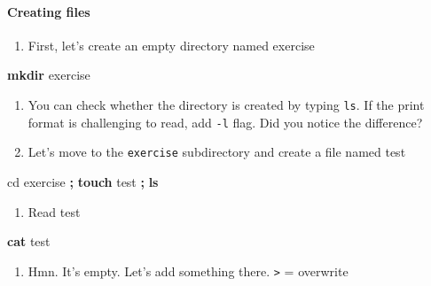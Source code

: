 \documentclass[
]{book}
\newenvironment{Shaded}{\begin{snugshade}}{\end{snugshade}}
\newcommand{\BuiltInTok}[1]{#1}
\newcommand{\FunctionTok}[1]{\textcolor[rgb]{0.13,0.29,0.53}{\textbf{#1}}}
\newcommand{\KeywordTok}[1]{\textcolor[rgb]{0.13,0.29,0.53}{\textbf{#1}}}
\newcommand{\NormalTok}[1]{#1}
\providecommand{\tightlist}{%
  \setlength{\itemsep}{0pt}\setlength{\parskip}{0pt}}
\begin{document}
\paragraph{Creating files}\label{creating-files}

\begin{enumerate}
\def\labelenumi{\arabic{enumi}.}
\tightlist
\item
  First, let's create an empty directory named exercise
\end{enumerate}

\begin{Shaded}
\begin{Highlighting}[]
\FunctionTok{mkdir}\NormalTok{ exercise}
\end{Highlighting}
\end{Shaded}

\begin{enumerate}
\def\labelenumi{\arabic{enumi}.}
\setcounter{enumi}{1}
\item
  You can check whether the directory is created by typing \texttt{ls}. If the print format is challenging to read, add \texttt{-l} flag. Did you notice the difference?
\item
  Let's move to the \texttt{exercise} subdirectory and create a file named test
\end{enumerate}

\begin{Shaded}
\begin{Highlighting}[]

\BuiltInTok{cd}\NormalTok{ exercise }\KeywordTok{;} \FunctionTok{touch}\NormalTok{ test }\KeywordTok{;} \FunctionTok{ls}
\end{Highlighting}
\end{Shaded}

\begin{enumerate}
\def\labelenumi{\arabic{enumi}.}
\setcounter{enumi}{3}
\tightlist
\item
  Read test
\end{enumerate}

\begin{Shaded}
\begin{Highlighting}[]
\FunctionTok{cat}\NormalTok{ test}
\end{Highlighting}
\end{Shaded}

\begin{enumerate}
\def\labelenumi{\arabic{enumi}.}
\setcounter{enumi}{4}
\tightlist
\item
  Hmn. It's empty. Let's add something there. \texttt{\textgreater{}} = overwrite
\end{enumerate}
\end{document}
